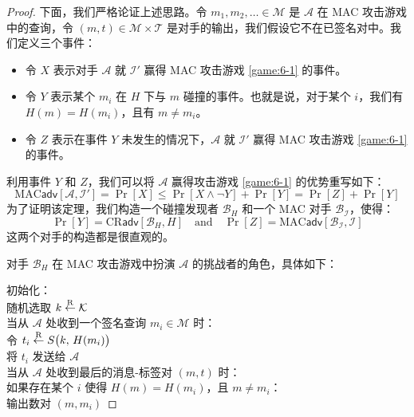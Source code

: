 \begin{proof}
下面，我们严格论证上述思路。令 $m_1,m_2,\dots\in\mathcal{M}$ 是 $\mathcal{A}$ 在 MAC 攻击游戏中的查询，令 $(m,t)\in\mathcal{M}\times\mathcal{T}$ 是对手的输出，我们假设它不在已签名对中。我们定义三个事件：
\begin{itemize}
	\item 令 $X$ 表示对手 $\mathcal{A}$ 就 $\mathcal{I}'$ 赢得 MAC 攻击游戏 \ref{game:6-1} 的事件。
	\item 令 $Y$ 表示某个 $m_i$ 在 $H$ 下与 $m$ 碰撞的事件。也就是说，对于某个 $i$，我们有 $H(m)=H(m_i)$，且有 $m\neq m_i$。
	\item 令 $Z$ 表示在事件 $Y$ 未发生的情况下，$\mathcal{A}$ 就 $\mathcal{I}'$ 赢得 MAC 攻击游戏 \ref{game:6-1} 的事件。
\end{itemize}
利用事件 $Y$ 和 $Z$，我们可以将 $\mathcal{A}$ 赢得攻击游戏 \ref{game:6-1} 的优势重写如下：
\begin{equation}\label{eq:8-2}
\mathrm{MAC}\mathsf{adv}[\mathcal{A},\mathcal{I}']
=\Pr[X]
\leq\Pr[X\land\lnot Y]+\Pr[Y]
=\Pr[Z]+\Pr[Y]
\end{equation}
为了证明该定理，我们构造一个碰撞发现者 $\mathcal{B}_H$ 和一个 MAC 对手 $\mathcal{B}_\mathcal{I}$，使得：
\[
\Pr[Y]=\mathrm{CR}\mathsf{adv}[\mathcal{B}_H,H]
\quad\text{and}\quad
\Pr[Z]=\mathrm{MAC}\mathsf{adv}[\mathcal{B}_\mathcal{I},\mathcal{I}]
\]
这两个对手的构造都是很直观的。

对手 $\mathcal{B}_H$ 在 MAC 攻击游戏中扮演 $\mathcal{A}$ 的挑战者的角色，具体如下：

\vspace{5pt}

\hspace*{5pt} 初始化：\\
\hspace*{50pt} 随机选取 $k\overset{\rm R}\leftarrow\mathcal{K}$\\
\hspace*{26pt} 当从 $\mathcal{A}$ 处收到一个签名查询 $m_i\in\mathcal{M}$ 时：\\
\hspace*{50pt} 令 $t_i\overset{\rm R}\leftarrow S\big(k,\,H(m_i)\big)$\\
\hspace*{50pt} 将 $t_i$ 发送给 $\mathcal{A}$\\
\hspace*{26pt} 当从 $\mathcal{A}$ 处收到最后的消息-标签对 $(m,t)$ 时：\\
\hspace*{50pt} 如果存在某个 $i$ 使得 $H(m)=H(m_i)$，且 $m\neq m_i$：\\
\hspace*{75pt} 输出数对 $(m,m_i)$


\end{proof}
